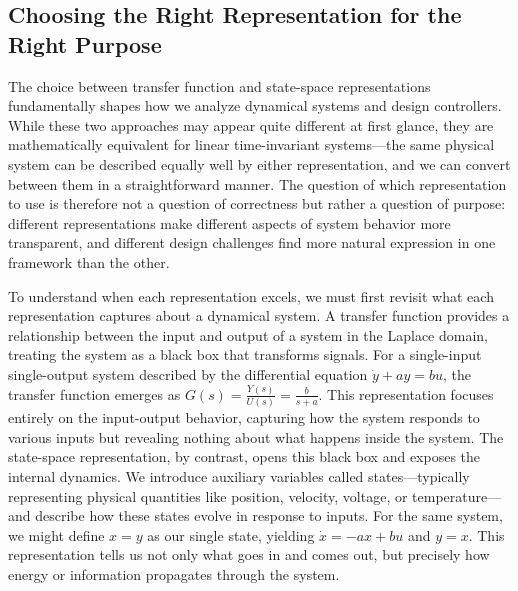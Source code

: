 \subsection{Choosing the Right Representation for the Right Purpose}

The choice between transfer function and state-space representations fundamentally shapes how we analyze dynamical systems and design controllers. While these two approaches may appear quite different at first glance, they are mathematically equivalent for linear time-invariant systems—the same physical system can be described equally well by either representation, and we can convert between them in a straightforward manner. The question of which representation to use is therefore not a question of correctness but rather a question of purpose: different representations make different aspects of system behavior more transparent, and different design challenges find more natural expression in one framework than the other.

To understand when each representation excels, we must first revisit what each representation captures about a dynamical system. A transfer function provides a relationship between the input and output of a system in the Laplace domain, treating the system as a black box that transforms signals. For a single-input single-output system described by the differential equation $\dot{y} + ay = bu$, the transfer function emerges as $G(s) = \frac{Y(s)}{U(s)} = \frac{b}{s+a}$. This representation focuses entirely on the input-output behavior, capturing how the system responds to various inputs but revealing nothing about what happens inside the system. The state-space representation, by contrast, opens this black box and exposes the internal dynamics. We introduce auxiliary variables called states—typically representing physical quantities like position, velocity, voltage, or temperature—and describe how these states evolve in response to inputs. For the same system, we might define $x = y$ as our single state, yielding $\dot{x} = -ax + bu$ and $y = x$. This representation tells us not only what goes in and comes out, but precisely how energy or information propagates through the system.

